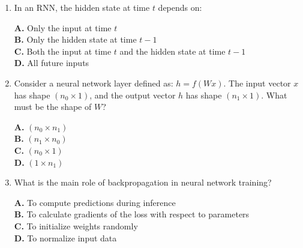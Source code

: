 \documentclass[11pt]{article}
\begin{document}
\begin{enumerate}[label=Q\arabic*., leftmargin=*]
\textbf{A.} The next word given the predicted history\\
\textbf{B.} The next word given the ground-truth history\\
\textbf{C.} The current word given itself\\
\textbf{D.} All words simultaneously

\item In an RNN, the hidden state at time $t$ depends on:

\textbf{A.} Only the input at time $t$\\
\textbf{B.} Only the hidden state at time $t-1$\\
\textbf{C.} Both the input at time $t$ and the hidden state at time $t-1$\\
\textbf{D.} All future inputs

\item Consider a neural network layer defined as: $h = f(Wx)$. The input vector $x$ has shape $(n_0 \times 1)$, and the output vector $h$ has shape $(n_1 \times 1)$. What must be the shape of $W$?

\textbf{A.} $(n_0 \times n_1)$\\
\textbf{B.} $(n_1 \times n_0)$\\
\textbf{C.} $(n_0 \times 1)$\\
\textbf{D.} $(1 \times n_1)$

\item What is the main role of backpropagation in neural network training?

\textbf{A.} To compute predictions during inference\\
\textbf{B.} To calculate gradients of the loss with respect to parameters\\
\textbf{C.} To initialize weights randomly\\
\textbf{D.} To normalize input data

\end{enumerate}
\end{document}
